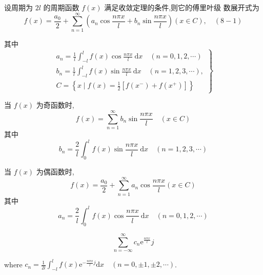 \begin{theorem}
    设周期为 $ 2 l $ 的周期函数 $ f(x) $ 满足收敛定理的条件,则它的傅里叶级 数展开式为
$$
f(x)=\frac{a_{0}}{2}+\sum_{n=1}^{\infty}\left(a_{n} \cos \frac{n \pi x}{l}+b_{n} \sin \frac{n \pi x}{l}\right)(x \in C), \quad(8-1)
$$

其中
$$
\left.\begin{array}{l}
a_{n}=\frac{1}{l} \int_{-l}^{l} f(x) \cos \frac{n \pi x}{l} \mathrm{~d} x \quad(n=0,1,2, \cdots) \\
b_{n}=\frac{1}{l} \int_{-l}^{l} f(x) \sin \frac{n \pi x}{l} \mathrm{~d} x \quad(n=1,2,3, \cdots), \\
C=\left\{x \mid f(x)=\frac{1}{2}\left[f\left(x^{-}\right)+f\left(x^{+}\right)\right]\right\}
\end{array}\right\}
$$



当 $ f(x) $ 为奇函数时,
$$
f(x)=\sum_{n=1}^{\infty} b_{n} \sin \frac{n \pi x}{l} \quad(x \in C)
$$
其中
$$
b_{n}=\frac{2}{l} \int_{0}^{l} f(x) \sin \frac{n \pi x}{l} \mathrm{~d} x \quad(n=1,2,3, \cdots)
$$

当 $ f(x) $ 为偶函数时,
$$
f(x)=\frac{a_{0}}{2}+\sum_{n=1}^{\infty} a_{n} \cos \frac{n \pi x}{l}(x \in C)
$$
其中
$$
a_{n}=\frac{2}{l} \int_{0}^{l} f(x) \cos \frac{n \pi x}{l} \mathrm{~d} x \quad(n=0,1,2, \cdots)
$$
\end{theorem}

\begin{definition}[傅里叶级数的复数形式]
    $$ \sum_{n=-\infty}^{\infty} c_{n} \mathrm{e}^{\frac{n \pi x}{l}}j $$

    where $c_{n}=\frac{1}{2 l} \int_{-l}^{l} f(x) \mathrm{e}^{-\frac{n \pi x}{l} j} \mathrm{d} x \quad(n=0, \pm 1, \pm 2, \cdots) $.
\end{definition}

